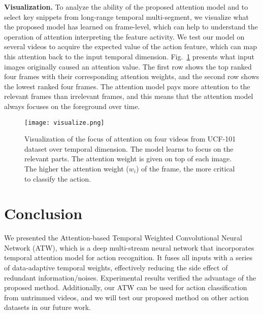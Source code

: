 \documentclass[runningheads,a4paper]{llncs}
\begin{document}
\noindent \textbf{Visualization.} To analyze the ability of the proposed attention model and to select key snippets from long-range temporal multi-segment, we visualize what the proposed model has learned on frame-level, which can help to understand the operation of attention interpreting the feature activity. We test our model on several videos to acquire the expected value of the action feature, which can map this attention back to the input temporal dimension. Fig.~\ref{fig:visualize} presents what input images originally caused an attention value. The first row shows the top ranked four frames with their corresponding attention weights, and the second row shows the lowest ranked four frames. The attention model pays more attention to the relevant frames than irrelevant frames, and this means that the attention model always focuses on the foreground over time.

\begin{figure}[t]
	\centering
	\texttt{[image: visualize.png]}

	\caption{Visualization of the focus of attention on four videos from
		UCF-101 dataset over temporal dimension. The model learns to focus on the relevant parts.
		The attention weight is given on top of each image. The higher the attention weight ($w_i$) of the frame,
		the more critical to classify the action.}
	\label{fig:visualize}
	\vspace{-0.05in}
\end{figure}
\section{Conclusion}

We presented the Attention-based Temporal Weighted Convolutional Neural Network (ATW), which is a deep multi-stream neural network that incorporates temporal attention model for action recognition. It fuses all inputs with a series of data-adaptive temporal weights, effectively reducing the side effect of redundant information/noises. Experimental results verified the advantage of the proposed method. Additionally, our ATW can be used for action classification from untrimmed videos, and we will test our proposed method on other action datasets in our future work.

\end{document}
